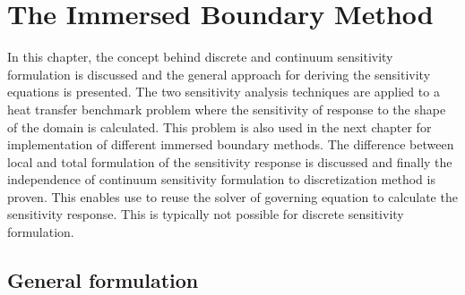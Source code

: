 \chapter{The Immersed Boundary Method}
In this chapter, the concept behind discrete and continuum sensitivity formulation is discussed and the general approach for deriving the sensitivity equations is presented. The two sensitivity analysis techniques are applied to a heat transfer benchmark problem where the sensitivity of response to the shape of the domain is calculated. This problem is also used in the next chapter for implementation of different immersed boundary methods. The difference between local and total formulation of the sensitivity response is discussed and finally the independence of continuum sensitivity formulation to discretization method is proven. This enables use to reuse the solver of governing equation to calculate the sensitivity response. This is typically not possible for discrete sensitivity formulation.

\section{General formulation}
